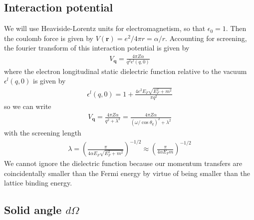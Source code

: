 \documentclass{article}
\begin{document}
\subsection{Interaction potential}

We will use Heaviside-Lorentz units for electromagnetism, so that $\epsilon_0 = 1$. Then the coulomb force is given by $V(\textbf{r}) = e^2 / 4 \pi r = \alpha / r$. Accounting for screening, the fourier transform of this interaction potential is given by \cite{french}
\begin{align}
V_\textbf{q} = \frac{4 \pi Z\alpha}{q^2 \epsilon^l(q, 0)}
\end{align}
where the electron longitudinal static dielectric function relative to the vacuum $\epsilon^l(q, 0)$ is given by
\begin{align}
\epsilon^l(q, 0) = 1 + \frac{4 e^2 E_F \sqrt{E_F^2 + m^2}}{\pi q^2}
\end{align}
so we can write
\begin{align}
V_\textbf{q} = \frac{4 \pi Z\alpha}{q^2 + \lambda^2} = \frac{4 \pi Z\alpha}{(\omega / \cos\theta_q)^2+ \lambda^2}
\label{eq:ScreenedInteractionPotential}
\end{align}
with the screening length
\begin{align}
\lambda = \left( \frac{\pi}{4 \alpha E_F \sqrt{E_F^2 + m^2}} \right)^{-1/2} \approx \left( \frac{\pi}{4 \alpha E_F m} \right)^{-1/2}
\end{align}
We cannot ignore the dielectric function because our momentum transfers are coincidentally smaller than the Fermi energy by virtue of being smaller than the lattice binding energy.

\subsection{Solid angle $d \Omega$}
\end{document}
